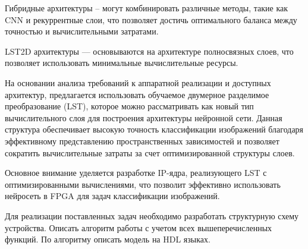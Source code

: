 Гибридные архитектуры – могут комбинировать различные методы, такие как CNN и 
рекуррентные слои, что позволяет достичь оптимального баланса между точностью и
вычислительными затратами.

LST2D архитектуры — основываются на архитектуре полносвязных слоев, что 
позволяет использовать минимальные вычислительные ресурсы.

На основании анализа требований к аппаратной реализации и доступных архитектур,
предлагается использовать обучаемое двумерное разделимое преобразование (LST), 
которое можно рассматривать как новый тип вычислительного слоя для построения 
архитектуры нейронной сети\cite{LST2D}. Данная структура обеспечивает высокую 
точность классификации изображений благодаря эффективному представлению 
пространственных зависимостей и позволяет сократить вычислительные затраты 
за счет оптимизированной структуры слоев.

Основное внимание уделяется разработке IP-ядра, реализующего LST с 
оптимизированными вычислениями, что позволит эффективно использовать нейросеть
в FPGA для задач классификации изображений.

Для реализации поставленных задач необходимо разработать структурную схему 
устройства. Описать алгоритм работы с учетом всех вышеперечисленных функций. 
По алгоритму описать модель на HDL языках.